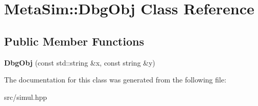 \hypertarget{classMetaSim_1_1DbgObj}{}\section{Meta\+Sim\+:\+:Dbg\+Obj Class Reference}
\label{classMetaSim_1_1DbgObj}
\subsection*{Public Member Functions}
\begin{DoxyCompactItemize}
\item 
{\bfseries Dbg\+Obj} (const std\+::string \&x, const string \&y)\hypertarget{classMetaSim_1_1DbgObj_a44d5ec7de8b812014f790a44205bc013}{}\label{classMetaSim_1_1DbgObj_a44d5ec7de8b812014f790a44205bc013}

\end{DoxyCompactItemize}


The documentation for this class was generated from the following file\+:\begin{DoxyCompactItemize}
\item 
src/simul.\+hpp\end{DoxyCompactItemize}
